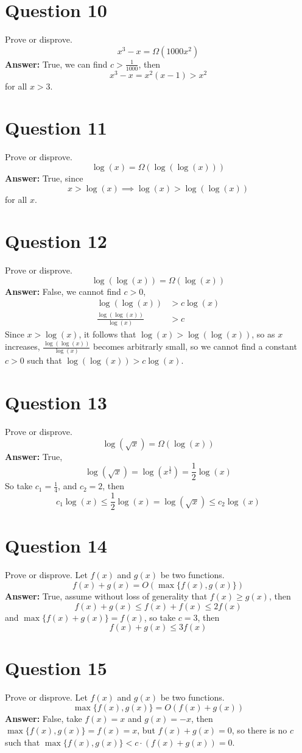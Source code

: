 \documentclass[openany]{report}
\begin{document}
\section{Question 10}
Prove or disprove.
\[x^3 - x = \Omega(1000x^2)\]
\textbf{Answer:} True, we can find $c > \frac{1}{1000}$, then 
\[x^3 - x = x^2(x-1)> x^2\]
for all $x > 3$.
\section{Question 11}
Prove or disprove.
\[\log(x) = \Omega(\log(\log(x)))\]
\textbf{Answer:} True, since 
\[x > \log(x) \implies \log(x) > \log(\log(x))\]
for all $x$. 
\section{Question 12}
Prove or disprove.
\[\log(\log(x)) = \Omega(\log(x))\]
\textbf{Answer:} False, we cannot find $c > 0$,
\begin{align*}
    \log(\log(x)) &> c\log(x)\\
    \frac{\log(\log(x))}{\log(x)} &> c
\end{align*}
Since $x > \log(x)$, it follows that $\log(x) > \log(\log(x))$, so as $x$ increases, $\frac{\log(\log(x))}{\log(x)}$ becomes arbitrarly small, so we cannot find a constant $c > 0$ such that $\log(\log(x)) > c \log(x)$.
\section{Question 13}
Prove or disprove.
\[\log(\sqrt{x}) = \Omega(\log(x))\]
\textbf{Answer:} True,
\[\log(\sqrt{x}) = \log\left(x^{\frac{1}{2}}\right) = \frac{1}{2}\log(x)\]
So take $c_1 = \frac{1}{4}$, and $c_2 = 2$, then
\[c_1 \log(x) \leq \frac{1}{2}\log(x) = \log(\sqrt{x}) \leq c_2 \log(x)\]
\section{Question 14}
Prove or disprove. Let $f(x)$ and $g(x)$ be two functions.
\[f(x) + g(x) = O(\max\{f(x), g(x)\})\]
\textbf{Answer:} True, assume without loss of generality that $f(x) \geq g(x)$, then
\[f(x) + g(x) \leq f(x) + f(x) \leq 2f(x)\]
and $\max\{f(x) + g(x)\} = f(x)$, so take $c = 3$, then 
\[f(x) + g(x) \leq 3 f(x)\]
\section{Question 15}
Prove or disprove. Let $f(x)$ and $g(x)$ be two functions.
\[\max\{f(x), g(x)\} = O(f(x) + g(x))\]
\textbf{Answer:} False, take $f(x) = x$ and $g(x) = -x$, then $\max\{f(x),g(x)\} = f(x) = x$, but $f(x) + g(x) = 0$, so there is no $c$ such that $\max\{f(x),g(x)\} < c \cdot (f(x) + g(x)) = 0$.
\end{document}
